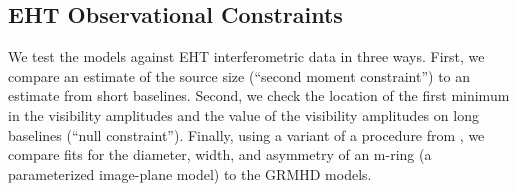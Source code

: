 \subsection{EHT Observational Constraints}




We test the models against EHT interferometric data in three ways.
First, we compare an estimate of the source size (``second moment constraint'') to an estimate from short baselines.
Second, we check the location of the first minimum in the visibility amplitudes and the value of the visibility amplitudes on long baselines (``null constraint'').
Finally, using a variant of a procedure from , we compare fits for the diameter, width, and asymmetry of an m-ring (a parameterized image-plane model) to the GRMHD models.

